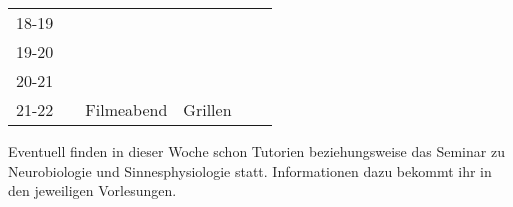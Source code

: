 \begin{table}[!h]
\begin{tabular}{|l|p{}|p{}|p{}|p{}|p{}|}
	18-19 &                                                                                             &  \cellcolor[HTML]{EFEFEF}                                                                                                     & \cellcolor[HTML]{EFEFEF}                              &                                 &                             \\ \cline{1-3}
	19-20 &                                                                                             &  \cellcolor[HTML]{EFEFEF}                                                                                                    & \cellcolor[HTML]{EFEFEF}                              &                                  &                             \\ \cline{1-3}
	20-21 &                                                                                             &  \cellcolor[HTML]{EFEFEF}                                                                                                       & \cellcolor[HTML]{EFEFEF}                              &                               &                             \\ \cline{1-3}
	21-22 &                                                                                             &  \multirow{-4}{*}{\cellcolor[HTML]{EFEFEF}\footnotesize{Filmeabend}}                                                                                                    & \multirow{-4}{*}{\cellcolor[HTML]{EFEFEF}\footnotesize{Grillen}} &     & \\ \hline
	\end{tabular}
	\end{table}

\footnotesize{Eventuell finden in dieser Woche schon Tutorien beziehungsweise das Seminar zu Neurobiologie und Sinnesphysiologie statt. Informationen dazu bekommt ihr in den jeweiligen Vorlesungen.}
\normalsize
\newpage

